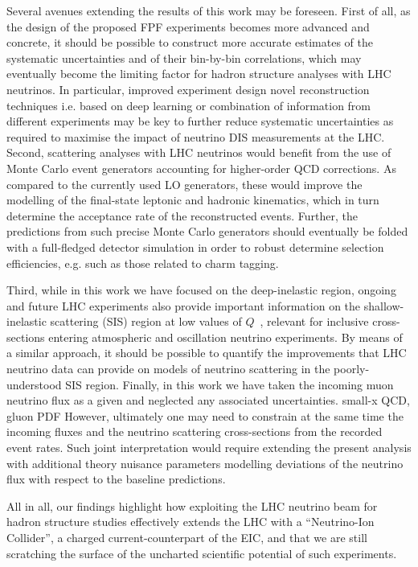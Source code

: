 Several avenues extending the results of this work may be foreseen.
%
First of all, as the design of the proposed FPF experiments
becomes more advanced and concrete, it should be possible
to construct more accurate estimates of the systematic
uncertainties and of their bin-by-bin correlations,
which may eventually become the limiting factor
for hadron structure analyses with LHC neutrinos.
%
In particular, improved experiment design novel reconstruction techniques i.e. based
on deep learning or combination of information from different
experiments may be key to further reduce systematic
uncertainties as required to maximise the impact
of neutrino DIS measurements at the LHC.
%
Second, scattering analyses with LHC neutrinos would benefit from
the use of Monte Carlo event generators accounting
for higher-order QCD corrections.
%
As compared to the currently used LO generators,
these would improve the modelling of the final-state leptonic
and hadronic kinematics, which in turn determine the acceptance rate
of the reconstructed events.
%
Further, the predictions from such precise Monte Carlo generators
should eventually be folded with a full-fledged detector simulation
in order to robust determine selection efficiencies, e.g.
such as those related to charm tagging.

Third, while in this work we have focused on the deep-inelastic
region, ongoing and future LHC experiments also provide
important information on the shallow-inelastic scattering (SIS)
region at low values of $Q$~\cite{Jeong:2023hwe,Candido:2023utz}, relevant for inclusive cross-sections
entering atmospheric and oscillation neutrino experiments.
%
By means of a similar approach, it should be possible to quantify
the improvements that LHC neutrino data can provide on models
of neutrino scattering in the poorly-understood SIS region.
%
Finally, in this work we have taken the incoming muon neutrino flux
as a given and neglected any associated uncertainties.
%
small-x QCD, gluon PDF
%
However, ultimately one may need to constrain at the same time
the incoming fluxes and the neutrino scattering cross-sections
from the recorded event rates.
%
Such joint interpretation would require extending the present
analysis with additional theory nuisance parameters modelling
deviations of the neutrino flux with respect to the baseline predictions.

All in all, our findings highlight how exploiting
the LHC neutrino beam for hadron structure studies effectively
extends the LHC with a ``Neutrino-Ion Collider'', a charged
current-counterpart of the EIC, and that we are still
scratching the surface of the uncharted
scientific potential of such experiments.

